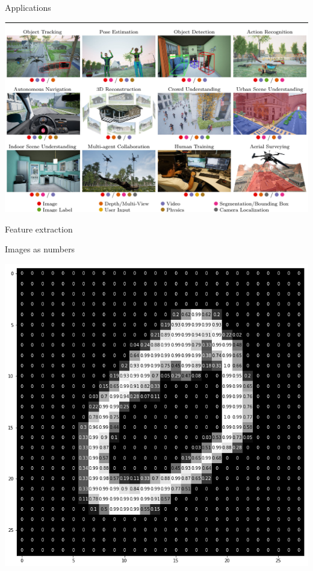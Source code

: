\documentclass[aspectratio=169,xcolor=dvipsnames]{beamer}
\begin{document}
\begin{frame}{Applications}
    \begin{center}
        \includegraphics[width=1.3\textheight]{../images/cv-applications.png}
    \end{center}
\end{frame}

\begin{frame}{Feature extraction}
    \begin{center}
    \end{center}
\end{frame}

\begin{frame}{Images as numbers}
    \begin{center}
        \includegraphics[width=0.8\textheight]{../images/mnist_cnn_keras_8_0.png}
    \end{center}
\end{frame}
\end{document}
